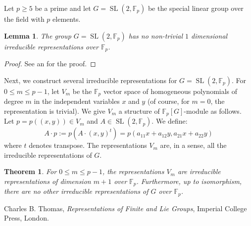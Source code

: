 \documentclass[12pt]{article}
\newtheorem*{thm}{Theorem}
\newtheorem*{lemma}{Lemma}
\theoremstyle{definition}
\newcommand{\SL}{\operatorname{SL}}
\newcommand{\F}{\mathbb{F}_p}
\begin{document}
Let $p\geq 5$ be a prime and let $G=\SL(2,\mathbb{F}_p)$ be the special linear group over the field with $p$ elements.

\begin{lemma}
The group $G=\SL(2,\F)$ has no non-trivial $1$ dimensional irreducible representations over $\F$.
\end{lemma}
\begin{proof}
See an  for the proof.
\end{proof}

Next, we construct several irreducible representations for $G=\SL(2,\F)$. For $0\leq m \leq p-1$, let $V_m$ be the $\F$ vector space of homogeneous polynomials of degree $m$ in the independent variables $x$ and $y$ (of course, for $m=0$, the representation is trivial). We give $V_m$ a structure of $\F[G]$-module as follows. Let $p=p((x,y))\in V_m$ and $A\in \SL(2,\F)$. We define:
$$ A\cdot p := p( A\cdot (x,y)^t)=p(a_{11}x+a_{12}y,a_{21}x+a_{22}y)$$
where $t$ denotes transpose. The representations $V_m$ are, in a sense, all the irreducible representations of $G$.

\begin{thm}
For $0\leq m \leq p-1$, the representations $V_m$ are irreducible representations of dimension $m+1$ over $\F$. Furthermore, up to isomorphism, there are no other irreducible representations of $G$ over $\F$.
\end{thm}

\begin{thebibliography}{00}
 Charles B. Thomas, {\em Representations of Finite and Lie Groups}, Imperial College Press, London.
\end{thebibliography}
\end{document}
